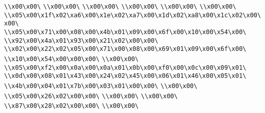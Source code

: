 \verb|\\x00\x00\|\newline
\verb|\\x00\x00\|\newline
\verb|\\x00\x00\|\newline
\verb|\\x00\x00\|\newline
\verb|\\x00\x00\|\newline
\verb|\\x00\x00\|\newline
\verb|\\x05\x00\x1f\x02\xa6\x00\x1e\x02\xa7\x00\x1d\x02\xa8\x00\x1c\x02\x00\x00\|\newline
\verb|\\x05\x00\x71\x00\x08\x00\x4b\x01\x09\x00\x6f\x00\x10\x00\x54\x00\|\newline
\verb|\\x92\x00\x4a\x01\x93\x00\x21\x02\x00\x00\|\newline
\verb|\\x02\x00\x22\x02\x05\x00\x71\x00\x08\x00\x69\x01\x09\x00\x6f\x00\|\newline
\verb|\\x10\x00\x54\x00\x00\x00\|\newline
\verb|\\x00\x00\|\newline
\verb|\\x05\x00\xf2\x00\x0a\x00\x0a\x01\x0b\x00\xf0\x00\x0c\x00\x09\x01\|\newline
\verb|\\x0d\x00\x08\x01\x43\x00\x24\x02\x45\x00\x06\x01\x46\x00\x05\x01\|\newline
\verb|\\x4b\x00\x04\x01\x7b\x00\x03\x01\x00\x00\|\newline
\verb|\\x00\x00\|\newline
\verb|\\x05\x00\x26\x02\x00\x00\|\newline
\verb|\\x00\x00\|\newline
\verb|\\x00\x00\|\newline
\verb|\\x87\x00\x28\x02\x00\x00\|\newline
\verb|\\x00\x00\|\newline
